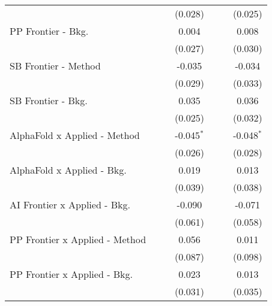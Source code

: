 \begin{tabular}{lcccccc}
                                  &              &               & (0.028)      &              &         & (0.025)\\   
   PP Frontier - Bkg.             &              &               & 0.004        &              &         & 0.008\\   
                                  &              &               & (0.027)      &              &         & (0.030)\\   
   SB Frontier - Method           &              &               & -0.035       &              &         & -0.034\\   
                                  &              &               & (0.029)      &              &         & (0.033)\\   
   SB Frontier - Bkg.             &              &               & 0.035        &              &         & 0.036\\   
                                  &              &               & (0.025)      &              &         & (0.032)\\   
   AlphaFold x Applied - Method   &              &               & -0.045$^{*}$ &              &         & -0.048$^{*}$\\   
                                  &              &               & (0.026)      &              &         & (0.028)\\   
   AlphaFold x Applied - Bkg.     &              &               & 0.019        &              &         & 0.013\\   
                                  &              &               & (0.039)      &              &         & (0.038)\\   
   AI Frontier x Applied - Bkg.   &              &               & -0.090       &              &         & -0.071\\   
                                  &              &               & (0.061)      &              &         & (0.058)\\   
   PP Frontier x Applied - Method &              &               & 0.056        &              &         & 0.011\\   
                                  &              &               & (0.087)      &              &         & (0.098)\\   
   PP Frontier x Applied - Bkg.   &              &               & 0.023        &              &         & 0.013\\   
                                  &              &               & (0.031)      &              &         & (0.035)\\   

\end{tabular}
